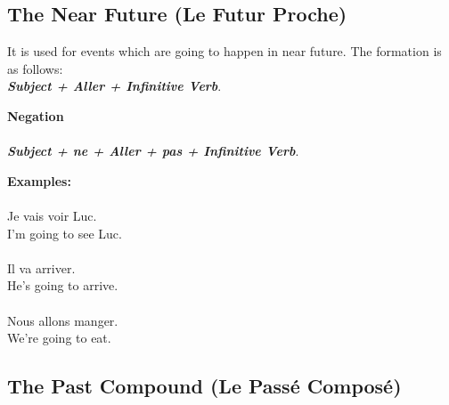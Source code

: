 \subsection{The Near Future (Le Futur Proche)}

It is used for events which are going to happen in near future.
The formation is as follows:\\

\textbf{\emph{Subject + Aller + Infinitive Verb}}.

\vspace{0.2in}

\noindent \textbf{Negation}\\\\
\textbf{\emph{Subject + ne + Aller + pas + Infinitive Verb}}.

\noindent \textbf{Examples:}\\\\
Je vais voir Luc.\\
I'm going to see Luc.\\\\
Il va arriver.\\
He's going to arrive.\\\\
Nous allons manger.\\
We're going to eat.

\subsection{The Past Compound (Le Pass\'e Compos\'e)}
